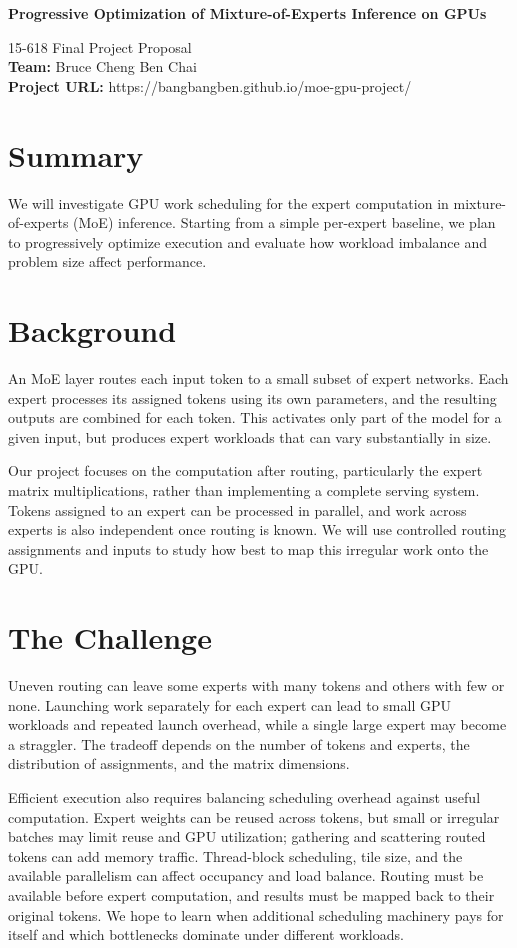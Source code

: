 \documentclass[11pt]{article}
\begin{document}
\begin{center}
{\LARGE\bfseries Progressive Optimization of Mixture-of-Experts Inference on GPUs\par}
\vspace{7pt}
15-618 Final Project Proposal\\
\textbf{Team:} Bruce Cheng \quad Ben Chai\\
\textbf{Project URL:} https://bangbangben.github.io/moe-gpu-project/
\end{center}
\section*{Summary}
We will investigate GPU work scheduling for the expert computation in mixture-of-experts (MoE) inference. Starting from a simple per-expert baseline, we plan to progressively optimize execution and evaluate how workload imbalance and problem size affect performance.
\section*{Background}
An MoE layer routes each input token to a small subset of expert networks. Each expert processes its assigned tokens using its own parameters, and the resulting outputs are combined for each token. This activates only part of the model for a given input, but produces expert workloads that can vary substantially in size.

Our project focuses on the computation after routing, particularly the expert matrix multiplications, rather than implementing a complete serving system. Tokens assigned to an expert can be processed in parallel, and work across experts is also independent once routing is known. We will use controlled routing assignments and inputs to study how best to map this irregular work onto the GPU.
\section*{The Challenge}
Uneven routing can leave some experts with many tokens and others with few or none. Launching work separately for each expert can lead to small GPU workloads and repeated launch overhead, while a single large expert may become a straggler. The tradeoff depends on the number of tokens and experts, the distribution of assignments, and the matrix dimensions.

Efficient execution also requires balancing scheduling overhead against useful computation. Expert weights can be reused across tokens, but small or irregular batches may limit reuse and GPU utilization; gathering and scattering routed tokens can add memory traffic. Thread-block scheduling, tile size, and the available parallelism can affect occupancy and load balance. Routing must be available before expert computation, and results must be mapped back to their original tokens. We hope to learn when additional scheduling machinery pays for itself and which bottlenecks dominate under different workloads.
\end{document}

